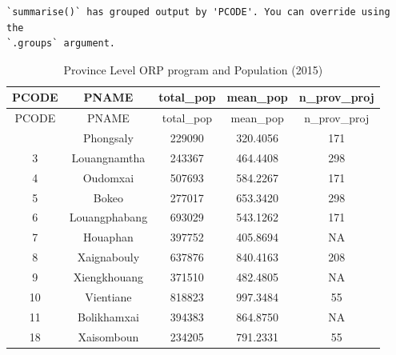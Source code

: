 \documentclass[
  letterpaper,
  DIV=11,
  numbers=noendperiod]{scrartcl}
\begin{document}
\begin{verbatim}
`summarise()` has grouped output by 'PCODE'. You can override using the
`.groups` argument.
\end{verbatim}

\begin{longtable}[]{@{}ccccc@{}}
\caption{Province Level ORP program and Population
(2015)}\tabularnewline
\toprule\noalign{}
PCODE & PNAME & total\_pop & mean\_pop & n\_prov\_proj \\
\midrule\noalign{}
\endfirsthead
\toprule\noalign{}
PCODE & PNAME & total\_pop & mean\_pop & n\_prov\_proj \\
\midrule\noalign{}
\endhead
\bottomrule\noalign{}
\endlastfoot
2 & Phongsaly & 229090 & 320.4056 & 171 \\
3 & Louangnamtha & 243367 & 464.4408 & 298 \\
4 & Oudomxai & 507693 & 584.2267 & 171 \\
5 & Bokeo & 277017 & 653.3420 & 298 \\
6 & Louangphabang & 693029 & 543.1262 & 171 \\
7 & Houaphan & 397752 & 405.8694 & NA \\
8 & Xaignabouly & 637876 & 840.4163 & 208 \\
9 & Xiengkhouang & 371510 & 482.4805 & NA \\
10 & Vientiane & 818823 & 997.3484 & 55 \\
11 & Bolikhamxai & 394383 & 864.8750 & NA \\
18 & Xaisomboun & 234205 & 791.2331 & 55 \\
\end{longtable}
\end{document}
